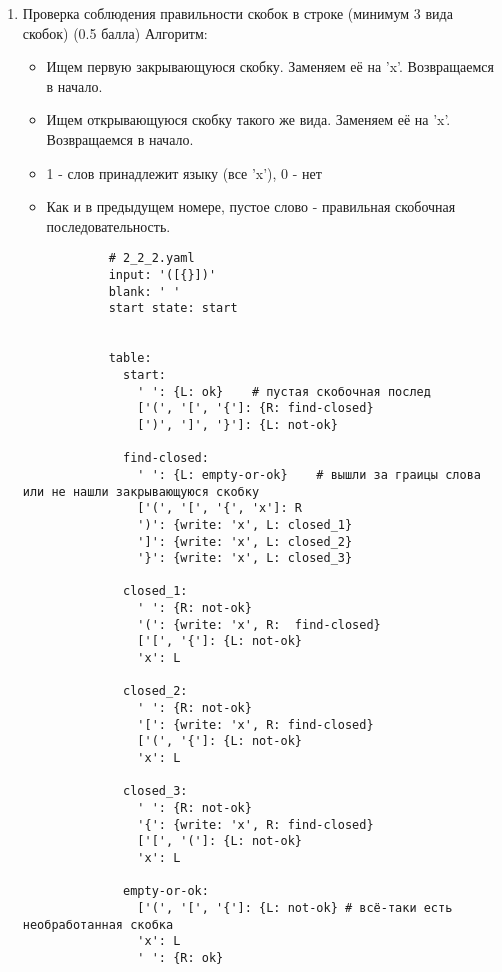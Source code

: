 \documentclass{article}
\begin{document}
\begin{enumerate}
    
    \item Проверка соблюдения правильности скобок в строке (минимум 3 вида скобок) (0.5 балла)
        Алгоритм:
        \begin{itemize}
            \item Ищем первую закрывающуюся скобку. Заменяем её на 'x'. Возвращаемся в начало.
            \item Ищем открывающуюся скобку такого же вида. Заменяем её на 'x'. Возвращаемся в начало.
            \item 1 - слов принадлежит языку (все 'x'), 0 - нет
            \item Как и в предыдущем номере, пустое слово - правильная скобочная последовательность.
        \end{itemize}
        
        \begin{verbatim}
            # 2_2_2.yaml
            input: '([{}])'
            blank: ' '
            start state: start
            
            
            table:
              start:
                ' ': {L: ok}    # пустая скобочная послед
                ['(', '[', '{']: {R: find-closed}
                [')', ']', '}']: {L: not-ok}
                
              find-closed:
                ' ': {L: empty-or-ok}    # вышли за граицы слова или не нашли закрывающуюся скобку
                ['(', '[', '{', 'x']: R
                ')': {write: 'x', L: closed_1}
                ']': {write: 'x', L: closed_2}
                '}': {write: 'x', L: closed_3}
              
              closed_1:
                ' ': {R: not-ok}
                '(': {write: 'x', R:  find-closed}
                ['[', '{']: {L: not-ok}
                'x': L
              
              closed_2:
                ' ': {R: not-ok}
                '[': {write: 'x', R: find-closed}
                ['(', '{']: {L: not-ok}
                'x': L
            
              closed_3:
                ' ': {R: not-ok}
                '{': {write: 'x', R: find-closed}
                ['[', '(']: {L: not-ok}
                'x': L 
                
              empty-or-ok:
                ['(', '[', '{']: {L: not-ok} # всё-таки есть необработанная скобка
                'x': L
                ' ': {R: ok}
                

\end{verbatim}
\end{enumerate}
\end{document}
